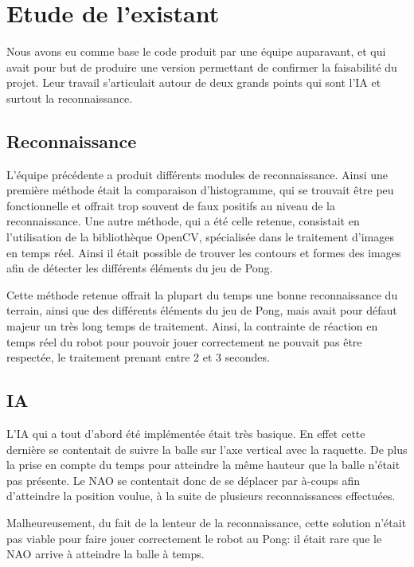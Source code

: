 \section{Etude de l'existant}
\label{sec:Etude de l'existant}
\par Nous avons eu comme base le code produit par une équipe auparavant, et qui avait pour but de produire une version permettant de confirmer la faisabilité du projet.
Leur travail s'articulait autour de deux grands points qui sont l'IA et surtout la reconnaissance.

    \subsection{Reconnaissance}
    \par L'équipe précédente a produit différents modules de reconnaissance.
    Ainsi une première méthode était la comparaison d'histogramme, qui se trouvait être peu fonctionnelle et offrait trop souvent de faux positifs au niveau de la reconnaissance.
    Une autre méthode, qui a été celle retenue, consistait en l'utilisation de la bibliothèque OpenCV, spécialisée dans le traitement d'images en temps réel.
    Ainsi il était possible de trouver les contours et formes des images afin de détecter les différents éléments du jeu de Pong.

    \par Cette méthode retenue offrait la plupart du temps une bonne reconnaissance du terrain, ainsi que des différents éléments du jeu de Pong, mais avait pour défaut majeur un très long temps de traitement.
    Ainsi, la contrainte de réaction en temps réel du robot pour pouvoir jouer correctement ne pouvait pas être respectée, le traitement prenant entre 2 et 3 secondes.

    \subsection{IA}
    \par L'IA qui a tout d'abord été implémentée était très basique.
    En effet cette dernière se contentait de suivre la balle sur l'axe vertical avec la raquette.
    De plus la prise en compte du temps pour atteindre la même hauteur que la balle n'était pas présente.
    Le NAO se contentait donc de se déplacer par à-coups afin d'atteindre la position voulue, à la suite de plusieurs reconnaissances effectuées.

    \par Malheureusement, du fait de la lenteur de la reconnaissance, cette solution n'était pas viable pour faire jouer correctement le robot au Pong: il était rare que le NAO arrive à atteindre la balle à temps.

